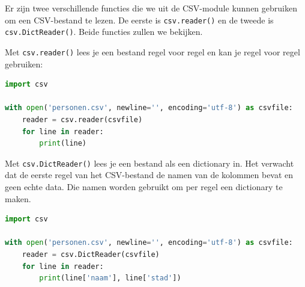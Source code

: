 Er zijn twee verschillende functies die we uit de CSV-module kunnen gebruiken om een CSV-bestand te lezen. De eerste is \texttt{csv.reader()} en de tweede is \texttt{csv.DictReader()}. Beide functies zullen we bekijken.

Met \texttt{csv.reader()} lees je een bestand regel voor regel en kan je regel voor regel gebruiken:
\begin{lstlisting}[language=Python]
import csv

with open('personen.csv', newline='', encoding='utf-8') as csvfile:
    reader = csv.reader(csvfile)
    for line in reader:
        print(line)
\end{lstlisting}


Met \texttt{csv.DictReader()} lees je een bestand als een dictionary in. Het verwacht dat de eerste regel van het CSV-bestand de namen van de kolommen bevat en geen echte data. Die namen worden gebruikt om per regel een dictionary te maken.

\begin{lstlisting}[language=Python]
import csv

with open('personen.csv', newline='', encoding='utf-8') as csvfile:
    reader = csv.DictReader(csvfile)
    for line in reader:
        print(line['naam'], line['stad'])
\end{lstlisting}

